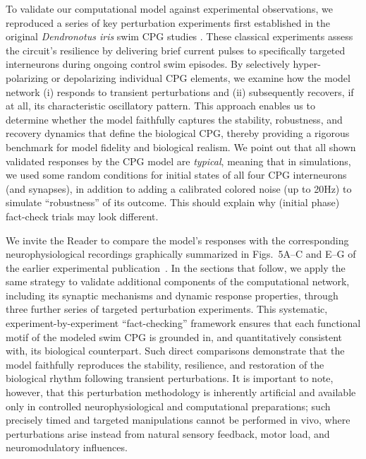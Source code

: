 \documentclass[nofootinbib,aip,amsmath,amssymb,reprint,twocolumn,10pt]{revtex4-2}
\begin{document}
To validate our computational model against experimental observations, we reproduced a series of key perturbation experiments first established in the original \textit{Dendronotus iris} swim CPG studies \cite{SakuraiKatz2016}.  These classical experiments assess the circuit's resilience by delivering brief current pulses to specifically targeted interneurons during ongoing control swim episodes. By selectively hyper-polarizing or depolarizing individual CPG elements, we examine how the model network (i) responds to transient perturbations and (ii) subsequently recovers, if at all, its characteristic oscillatory pattern. This approach enables us to determine whether the model faithfully captures the stability, robustness, and recovery dynamics that define the biological CPG, thereby providing a rigorous benchmark for model fidelity and biological realism. We point out that all shown validated responses by the CPG model are {\em typical}, meaning that in simulations, we used some random  conditions for initial states of all four CPG interneurons (and synapses), in addition to adding a calibrated colored noise (up to 20Hz) to simulate ``robustness'' of its outcome. This should explain why (initial phase) fact-check trials may look different.    

We invite the Reader to compare the model's responses with the corresponding neurophysiological recordings graphically summarized in Figs.~5A--C and E--G of the earlier experimental publication~\cite{SakuraiKatz2016}. In the sections that follow, we apply the same strategy to validate additional components of the computational network, including its synaptic mechanisms and dynamic response properties, through three further series of targeted perturbation experiments. This systematic, experiment-by-experiment ``fact-checking'' framework ensures that each functional motif of the modeled swim CPG is grounded in, and quantitatively consistent with, its biological counterpart. Such direct comparisons demonstrate that the model faithfully reproduces the stability, resilience, and restoration of the biological rhythm following transient perturbations. It is important to note, however, that this perturbation methodology is inherently artificial and available only in controlled neurophysiological and computational preparations; such precisely timed and targeted manipulations cannot be performed in vivo, where perturbations arise instead from natural sensory feedback, motor load, and neuromodulatory influences.
\end{document}
